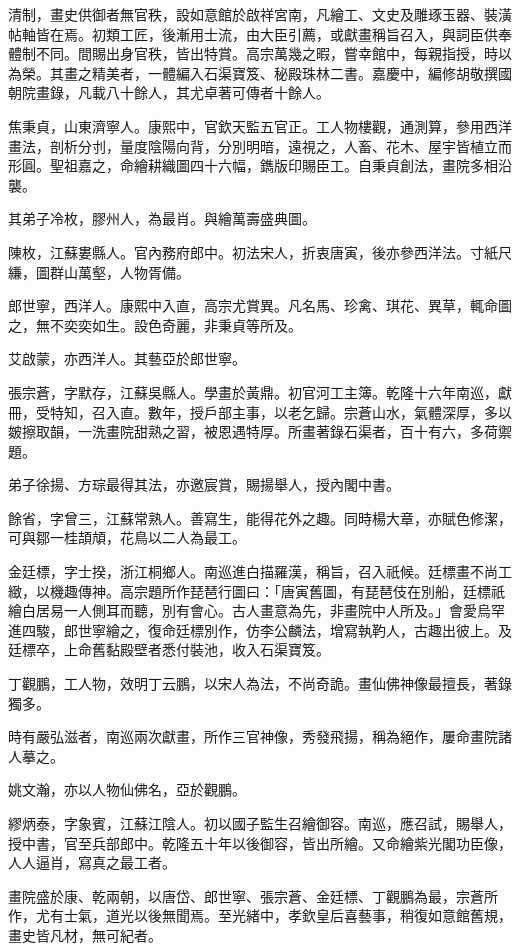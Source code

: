 \begin{pinyinscope}
清制，畫史供御者無官秩，設如意館於啟祥宮南，凡繪工、文史及雕琢玉器、裝潢帖軸皆在焉。初類工匠，後漸用士流，由大臣引薦，或獻畫稱旨召入，與詞臣供奉體制不同。間賜出身官秩，皆出特賞。高宗萬幾之暇，嘗幸館中，每親指授，時以為榮。其畫之精美者，一體編入石渠寶笈、秘殿珠林二書。嘉慶中，編修胡敬撰國朝院畫錄，凡載八十餘人，其尤卓著可傳者十餘人。

焦秉貞，山東濟寧人。康熙中，官欽天監五官正。工人物樓觀，通測算，參用西洋畫法，剖析分刌，量度陰陽向背，分別明暗，遠視之，人畜、花木、屋宇皆植立而形圓。聖祖嘉之，命繪耕織圖四十六幅，鐫版印賜臣工。自秉貞創法，畫院多相沿襲。

其弟子冷枚，膠州人，為最肖。與繪萬壽盛典圖。

陳枚，江蘇婁縣人。官內務府郎中。初法宋人，折衷唐寅，後亦參西洋法。寸紙尺縑，圖群山萬壑，人物胥備。

郎世寧，西洋人。康熙中入直，高宗尤賞異。凡名馬、珍禽、琪花、異草，輒命圖之，無不奕奕如生。設色奇麗，非秉貞等所及。

艾啟蒙，亦西洋人。其藝亞於郎世寧。

張宗蒼，字默存，江蘇吳縣人。學畫於黃鼎。初官河工主簿。乾隆十六年南巡，獻冊，受特知，召入直。數年，授戶部主事，以老乞歸。宗蒼山水，氣體深厚，多以皴擦取韻，一洗畫院甜熟之習，被恩遇特厚。所畫著錄石渠者，百十有六，多荷禦題。

弟子徐揚、方琮最得其法，亦邀宸賞，賜揚舉人，授內閣中書。

餘省，字曾三，江蘇常熟人。善寫生，能得花外之趣。同時楊大章，亦賦色修潔，可與鄒一桂頡頏，花鳥以二人為最工。

金廷標，字士揆，浙江桐鄉人。南巡進白描羅漢，稱旨，召入祇候。廷標畫不尚工緻，以機趣傳神。高宗題所作琵琶行圖曰：「唐寅舊圖，有琵琶伎在別船，廷標祇繪白居易一人側耳而聽，別有會心。古人畫意為先，非畫院中人所及。」會愛烏罕進四駿，郎世寧繪之，復命廷標別作，仿李公麟法，增寫執靮人，古趣出彼上。及廷標卒，上命舊黏殿壁者悉付裝池，收入石渠寶笈。

丁觀鵬，工人物，效明丁云鵬，以宋人為法，不尚奇詭。畫仙佛神像最擅長，著錄獨多。

時有嚴弘滋者，南巡兩次獻畫，所作三官神像，秀發飛揚，稱為絕作，屢命畫院諸人摹之。

姚文瀚，亦以人物仙佛名，亞於觀鵬。

繆炳泰，字象賓，江蘇江陰人。初以國子監生召繪御容。南巡，應召試，賜舉人，授中書，官至兵部郎中。乾隆五十年以後御容，皆出所繪。又命繪紫光閣功臣像，人人逼肖，寫真之最工者。

畫院盛於康、乾兩朝，以唐岱、郎世寧、張宗蒼、金廷標、丁觀鵬為最，宗蒼所作，尤有士氣，道光以後無聞焉。至光緒中，孝欽皇后喜藝事，稍復如意館舊規，畫史皆凡材，無可紀者。


\end{pinyinscope}
